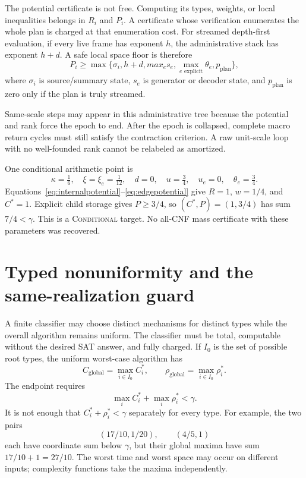 \documentclass[11pt]{article}
\begin{document}
The potential certificate is not free.  Computing its types, weights, or
local inequalities belongs in \(R_i\) and \(P_i\).  A certificate whose
verification enumerates the whole plan is charged at that enumeration cost.
For streamed depth-first evaluation, if every live frame has exponent \(h\),
the administrative stack has exponent \(h+d\).  A safe local space floor is
therefore
\begin{equation}
 P_i\ge\max\{\sigma_i,h+d,max_e s_e,
     \max_{e\text{ explicit}}\theta_e,p_{\mathrm{plan}}\},
 \label{eq:potentialspace}
\end{equation}
where \(\sigma_i\) is source/summary state, \(s_e\) is generator or decoder
state, and \(p_{\mathrm{plan}}\) is zero only if the plan is truly streamed.

Same-scale steps may appear in this administrative tree because the potential
and rank force the epoch to end.  After the epoch is collapsed, complete
macro return cycles must still satisfy the contraction criterion.  A raw
unit-scale loop with no well-founded rank cannot be relabeled as amortized.

One conditional arithmetic point is
\[
 \kappa=\tfrac16,\quad\xi=\xi_e=\tfrac1{12},
 \quad d=0,\quad u=\tfrac34,\quad u_e=0,
 \quad\theta_e=\tfrac34.
\]
Equations~\eqref{eq:internalpotential}--\eqref{eq:edgepotential} give
\(R=1\), \(w=1/4\), and \(C^*=1\).  Explicit child storage gives
\(P\ge3/4\), so \((C^*,P)=(1,3/4)\) has sum \(7/4<\gamma\).  This is a
\textsc{Conditional} target.  No all-CNF mass certificate with these
parameters was recovered.

\section{Typed nonuniformity and the same-realization guard}

A finite classifier may choose distinct mechanisms for distinct types while
the overall algorithm remains uniform.  The classifier must be total,
computable without the desired SAT answer, and fully charged.  If \(I_0\) is
the set of possible root types, the uniform worst-case algorithm has
\begin{equation}
 C_{\mathrm{global}}=\max_{i\in I_0}C_i^*,\qquad
 \rho_{\mathrm{global}}=\max_{i\in I_0}\rho_i^*.
 \label{eq:globalmaxima}
\end{equation}
The endpoint requires
\begin{equation}
 \boxed{\max_i C_i^*+\max_i\rho_i^*<\gamma.}
 \label{eq:samerealization}
\end{equation}
It is not enough that \(C_i^*+\rho_i^*<\gamma\) separately for every type.
For example, the two pairs
\[
 (17/10,1/20),\qquad(4/5,1)
\]
each have coordinate sum below \(\gamma\), but their global maxima have sum
\(17/10+1=27/10\).  The worst time and worst space may occur on different
inputs; complexity functions take the maxima independently.
\end{document}
